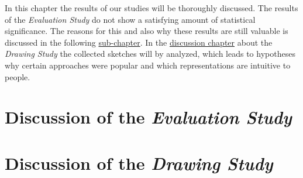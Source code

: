 In this chapter the results of our studies will be thoroughly discussed. The results of the \textit{Evaluation Study} do not show a satisfying amount of statistical significance. The reasons for this and also why these results are still valuable is discussed in the following \hyperref[ch:discussionEvaluation]{sub-chapter}. In the \hyperref[ch:DiscussionDrawing]{discussion chapter} about the \textit{Drawing Study} the collected sketches will by analyzed, which leads to hypotheses why certain approaches were popular and which representations are intuitive to people.

\section{Discussion of the \textit{Evaluation Study}}
\label{ch:discussionEvaluation}



\section{Discussion of the \textit{Drawing Study}}
\label{ch:DiscussionDrawing}

